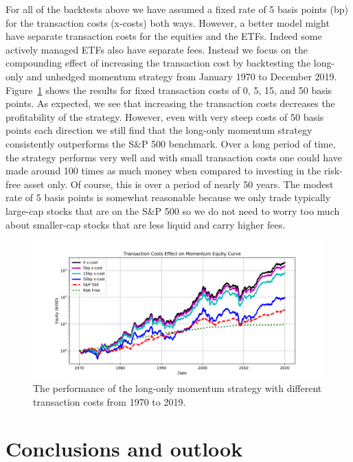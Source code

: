 \documentclass[10pt, letterpaper]{article}
\begin{document}
For all of the backtests above we have assumed a fixed rate of 5 basis points (bp) for the transaction costs (x-costs) both ways.  However, a better model might have separate transaction costs for the equities and the ETFs.  Indeed some actively managed ETFs also have separate fees.  Instead we focus on the compounding effect of increasing the transaction cost by backtesting the long-only and unhedged momentum strategy from January 1970 to December 2019.  Figure~\ref{fig:xcost_comparison} shows the results for fixed transaction costs of 0, 5, 15, and 50 basis points.  As expected, we see that increasing the transaction costs decreases the profitability of the strategy.  However, even with very steep costs of 50 basis points each direction we still find that the long-only momentum strategy consistently outperforms the S\&P 500 benchmark.  Over a long period of time, the strategy performs very well and with small transaction costs one could have made around 100 times as much money when compared to investing in the risk-free asset only.  Of course, this is over a period of nearly 50 years.  The modest rate of 5 basis points is somewhat reasonable because we only trade typically large-cap stocks that are on the S\&P 500 so we do not need to worry too much about smaller-cap stocks that are less liquid and carry higher fees.

\begin{figure}[H]
\centering
\includegraphics[width=\textwidth]{xcost_comparison.png}
\caption{The performance of the long-only momentum strategy with different transaction costs from 1970 to 2019.}
\label{fig:xcost_comparison}
\end{figure}



\section{Conclusions and outlook}
\end{document}
